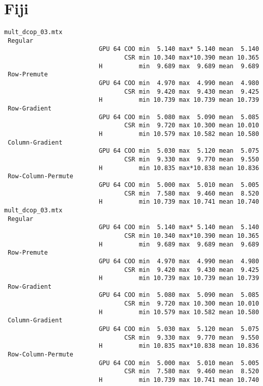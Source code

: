 \section{Fiji}
\label{sec:fiji}
{\tiny

\begin{verbatim}
mult_dcop_03.mtx
 Regular
                          GPU 64 COO min  5.140 max* 5.140 mean  5.140
                                 CSR min 10.340 max*10.390 mean 10.365
                          H          min  9.689 max  9.689 mean  9.689
 Row-Premute
                          GPU 64 COO min  4.970 max  4.990 mean  4.980
                                 CSR min  9.420 max  9.430 mean  9.425
                          H          min 10.739 max 10.739 mean 10.739
 Row-Gradient
                          GPU 64 COO min  5.080 max  5.090 mean  5.085
                                 CSR min  9.720 max 10.300 mean 10.010
                          H          min 10.579 max 10.582 mean 10.580
 Column-Gradient
                          GPU 64 COO min  5.030 max  5.120 mean  5.075
                                 CSR min  9.330 max  9.770 mean  9.550
                          H          min 10.835 max*10.838 mean 10.836
 Row-Column-Permute
                          GPU 64 COO min  5.000 max  5.010 mean  5.005
                                 CSR min  7.580 max  9.460 mean  8.520
                          H          min 10.739 max 10.741 mean 10.740
mult_dcop_03.mtx
 Regular
                          GPU 64 COO min  5.140 max* 5.140 mean  5.140
                                 CSR min 10.340 max*10.390 mean 10.365
                          H          min  9.689 max  9.689 mean  9.689
 Row-Premute
                          GPU 64 COO min  4.970 max  4.990 mean  4.980
                                 CSR min  9.420 max  9.430 mean  9.425
                          H          min 10.739 max 10.739 mean 10.739
 Row-Gradient
                          GPU 64 COO min  5.080 max  5.090 mean  5.085
                                 CSR min  9.720 max 10.300 mean 10.010
                          H          min 10.579 max 10.582 mean 10.580
 Column-Gradient
                          GPU 64 COO min  5.030 max  5.120 mean  5.075
                                 CSR min  9.330 max  9.770 mean  9.550
                          H          min 10.835 max*10.838 mean 10.836
 Row-Column-Permute
                          GPU 64 COO min  5.000 max  5.010 mean  5.005
                                 CSR min  7.580 max  9.460 mean  8.520
                          H          min 10.739 max 10.741 mean 10.740

\end{verbatim}}
